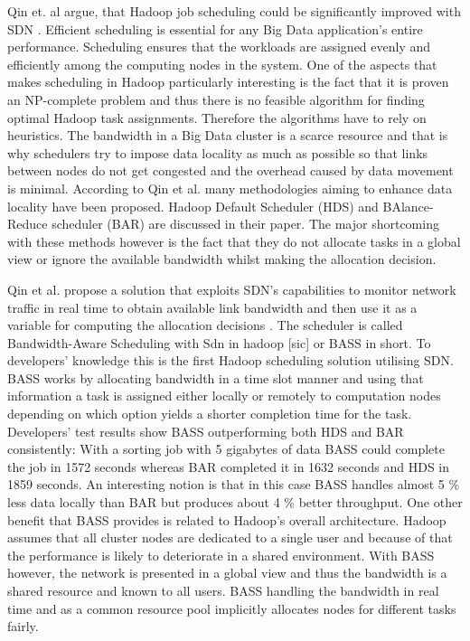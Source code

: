 \documentclass{acm_proc_article-sp}
\begin{document}
Qin et. al argue, that Hadoop job scheduling could be significantly improved with SDN \cite{Scheduling}. Efficient scheduling is essential for any Big Data application's entire performance. Scheduling ensures that the workloads are assigned evenly and efficiently among the computing nodes in the system. One of the aspects that makes scheduling in Hadoop particularly interesting is the fact that it is proven an NP-complete problem \cite{Fischer:2010:ATE:1810479.1810484} and thus there is no feasible algorithm for finding optimal Hadoop task assignments. Therefore the algorithms have to rely on heuristics. The bandwidth in a Big Data cluster is a scarce resource and that is why schedulers try to impose data locality as much as possible so that links between nodes do not get congested and the overhead caused by data movement is minimal. According to Qin et al. many methodologies aiming to enhance data locality have been proposed. Hadoop Default Scheduler (HDS) and BAlance-Reduce scheduler (BAR) are discussed in their paper. The major shortcoming with these methods however is the fact that they do not allocate tasks in a global view or ignore the available bandwidth whilst making the allocation decision.

Qin et al. propose a solution that exploits SDN's capabilities to monitor network traffic in real time to obtain available link bandwidth and then use it as a variable for computing the allocation decisions \cite{Scheduling}. The scheduler is called Bandwidth-Aware Scheduling with Sdn in hadoop [sic] or BASS in short. To developers' knowledge this is the first Hadoop scheduling solution utilising SDN. BASS works by allocating bandwidth in a time slot manner and using that information a task is assigned either locally or remotely to computation nodes depending on which option yields a shorter completion time for the task. Developers' test results show BASS outperforming both HDS and BAR consistently: With a sorting job with 5 gigabytes of data BASS could complete the job in 1572 seconds whereas BAR completed it in 1632 seconds and HDS in 1859 seconds. An interesting notion is that in this case BASS handles almost 5 \% less data locally than BAR but produces about 4 \% better throughput. One other benefit that BASS provides is related to Hadoop's overall architecture. Hadoop assumes that all cluster nodes are dedicated to a single user and because of that the performance is likely to deteriorate in a shared environment. With BASS however, the network is presented in a global view and thus the bandwidth is a shared resource and known to all users. BASS handling the bandwidth in real time and as a common resource pool implicitly allocates nodes for different tasks fairly.
\end{document}
